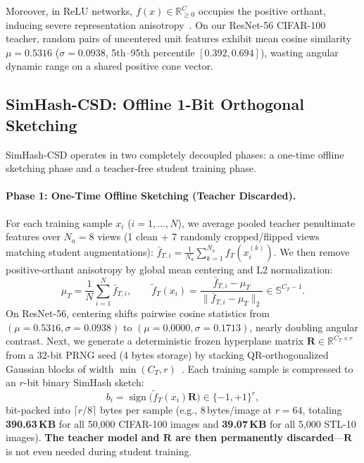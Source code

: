 \documentclass{article}
\begin{document}
Moreover, in ReLU networks, $f(x) \in \mathbb{R}_{\ge 0}^C$ occupies the positive orthant, inducing severe representation anisotropy~\citep{mu2018all}. On our ResNet-56 CIFAR-100 teacher, random pairs of uncentered unit features exhibit mean cosine similarity $\mu = 0.5316$ ($\sigma = 0.0938$, 5th--95th percentile $[0.392, 0.694]$), wasting angular dynamic range on a shared positive cone vector.

\subsection{SimHash-CSD: Offline 1-Bit Orthogonal Sketching}

SimHash-CSD operates in two completely decoupled phases: a one-time offline sketching phase and a teacher-free student training phase.

\paragraph{Phase 1: One-Time Offline Sketching (Teacher Discarded).}
For each training sample $x_i$ ($i=1,\dots,N$), we average pooled teacher penultimate features over $N_a=8$ views (1 clean + 7 randomly cropped/flipped views matching student augmentations): $\bar{f}_{T,i} = \frac{1}{N_a}\sum_{k=1}^{N_a} f_T(x_i^{(k)})$. We then remove positive-orthant anisotropy by global mean centering and L2 normalization:
\begin{equation}
    \mu_T = \frac{1}{N}\sum_{i=1}^N \bar{f}_{T,i}, \qquad \tilde{f}_T(x_i) = \frac{\bar{f}_{T,i} - \mu_T}{\|\bar{f}_{T,i} - \mu_T\|_2} \in \mathbb{S}^{C_T - 1}.
\end{equation}
On ResNet-56, centering shifts pairwise cosine statistics from $(\mu=0.5316, \sigma=0.0938)$ to $(\mu=0.0000, \sigma=0.1713)$, nearly doubling angular contrast. Next, we generate a deterministic frozen hyperplane matrix $\mathbf{R}\in\mathbb{R}^{C_T\times r}$ from a 32-bit PRNG seed (4 bytes storage) by stacking QR-orthogonalized Gaussian blocks of width $\min(C_T, r)$~\citep{choromanski2017unreasonable}. Each training sample is compressed to an $r$-bit binary SimHash sketch:
\begin{equation}
    b_i = \operatorname{sign}\!\big(\tilde{f}_T(x_i)\mathbf{R}\big) \in \{-1, +1\}^r,
\end{equation}
bit-packed into $\lceil r/8 \rceil$ bytes per sample (e.g., $8$\,bytes/image at $r=64$, totaling \textbf{390.63\,KB} for all 50,000 CIFAR-100 images and \textbf{39.07\,KB} for all 5,000 STL-10 images). \textbf{The teacher model and $\mathbf{R}$ are then permanently discarded}---$\mathbf{R}$ is not even needed during student training.
\end{document}
